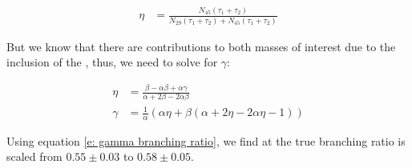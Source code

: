 \begin{align}
	\eta & = \frac{N_{45}(\tau_1 + \tau_2)}{N_{29}(\tau_1 + \tau_2) + N_{45}(\tau_1 + \tau_2)}
\end{align}

But we know that there are contributions to both masses of interest due to the inclusion of the , thus, we need to solve for $\gamma$:

\begin{align}
	\eta & = \frac{\beta - \alpha \beta + \alpha \gamma}{\alpha + 2\beta - 2\alpha\beta} \\
	\gamma & = \frac{1}{\alpha} (\alpha \eta + \beta(\alpha + 2\eta - 2\alpha \eta - 1)) \label{e: gamma branching ratio}
\end{align}

Using equation \ref{e: gamma branching ratio}, we find at the true branching ratio is scaled from $0.55 \pm 0.03$ to $0.58 \pm 0.05$.
